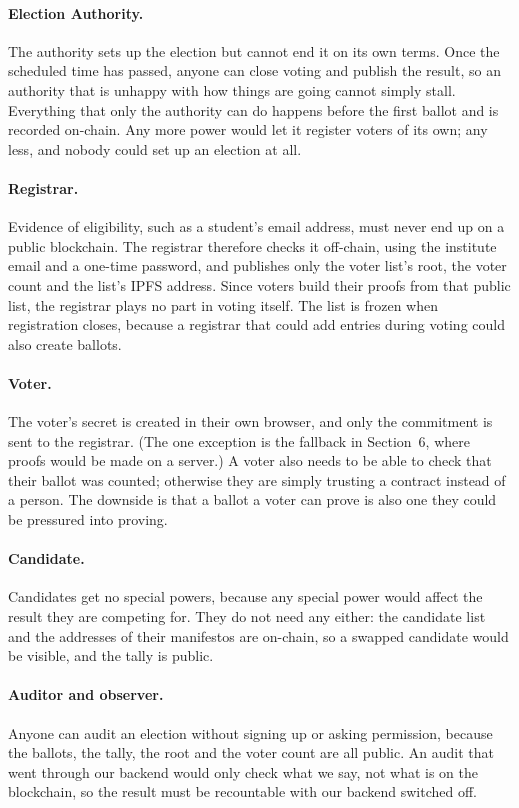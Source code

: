 \paragraph{Election Authority.}
The authority sets up the election but cannot end it on its own terms. Once
the scheduled time has passed, anyone can close voting and publish the result,
so an authority that is unhappy with how things are going cannot simply stall.
Everything that only the authority can do happens before the first ballot and
is recorded on-chain. Any more power would let it register voters of its own;
any less, and nobody could set up an election at all.

\paragraph{Registrar.}
Evidence of eligibility, such as a student's email address, must never end up
on a public blockchain. The registrar therefore checks it off-chain, using the
institute email and a one-time password, and publishes only the voter list's
root, the voter count and the list's IPFS address. Since voters build their
proofs from that public list, the registrar plays no part in voting itself.
The list is frozen when registration closes, because a registrar that could
add entries during voting could also create ballots.

\paragraph{Voter.}
The voter's secret is created in their own browser, and only the commitment is
sent to the registrar. (The one exception is the fallback in Section~6, where
proofs would be made on a server.) A voter also needs to be able to check that
their ballot was counted; otherwise they are simply trusting a contract instead
of a person. The downside is that a ballot a voter can prove is also one they
could be pressured into proving.

\paragraph{Candidate.}
Candidates get no special powers, because any special power would affect the
result they are competing for. They do not need any either: the candidate list
and the addresses of their manifestos are on-chain, so a swapped candidate
would be visible, and the tally is public.

\paragraph{Auditor and observer.}
Anyone can audit an election without signing up or asking permission, because
the ballots, the tally, the root and the voter count are all public. An audit
that went through our backend would only check what we say, not what is on the
blockchain, so the result must be recountable with our backend switched off.

